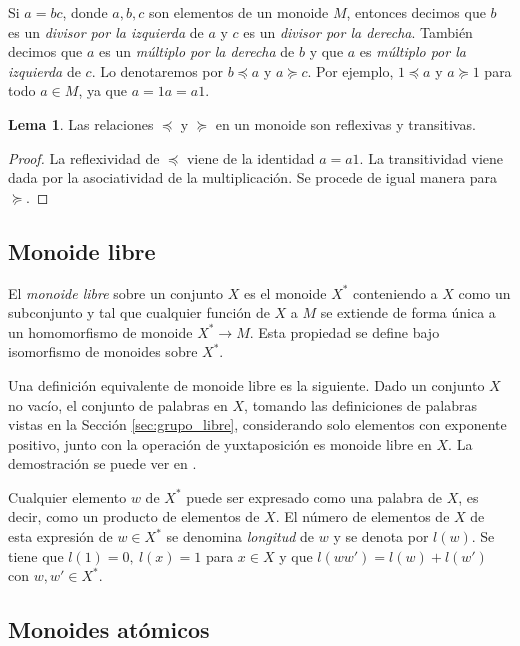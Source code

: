 \documentclass[12pt]{book}
\theoremstyle{definition}
\newtheorem{lema}{Lema}[section]
\begin{document}
Si $a=bc$, donde $a,b,c$ son elementos de un monoide $M$, entonces decimos que $b$ es un \textit{divisor por la izquierda} de $a$ y $c$ es un \textit{divisor por la derecha}. También decimos que $a$ es un \textit{múltiplo por la derecha} de $b$ y que $a$ es \textit{múltiplo por la izquierda} de $c$. Lo denotaremos por $b\preceq a$ y $a\succeq c$. Por ejemplo, $1\preceq a$ y $a\succeq 1$ para todo $a\in M$, ya que $a=1a=a1$.

\begin{lema}
Las relaciones $\preceq$ y $\succeq$ en un monoide son reflexivas y transitivas.
\label{lema:rel1}
\end{lema}

\begin{proof} La reflexividad de $\preceq$ viene de la identidad $a=a1$. La transitividad viene dada por la asociatividad de la multiplicación. Se procede de igual manera para $\succeq$.
\end{proof}

\subsection{Monoide libre}
El \textit{monoide libre} sobre un conjunto $X$ es el monoide $X^*$ conteniendo a $X$ como un subconjunto y tal que cualquier función de $X$ a $M$ se extiende de forma única a un homomorfismo de monoide $X^*\rightarrow M$. Esta propiedad se define bajo isomorfismo de monoides sobre $X^*$.

Una definición equivalente de monoide libre es la siguiente. Dado un conjunto $X$ no vacío, el conjunto de palabras en $X$, tomando las definiciones de palabras vistas en la Sección \ref{sec:grupo_libre}, considerando solo elementos con exponente positivo, junto con la operación de yuxtaposición es monoide libre en $X$. La demostración se puede ver en \cite{monoides}.


Cualquier elemento $w$ de $X^*$ puede ser expresado como una palabra de $X$, es decir, como un producto de elementos de $X$. El número de elementos de $X$ de esta expresión de $w\in X^*$ se denomina \textit{longitud} de $w$ y se denota por $l(w)$. Se tiene que $l(1)=0,\ l(x)=1$ para $x\in X$ y que $l(ww')=l(w)+l(w')$ con $w,w'\in X^*$.
\label{monoide_libre}
\subsection{Monoides atómicos}
\end{document}

